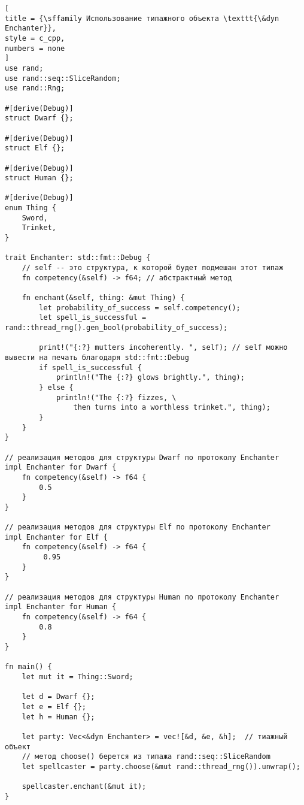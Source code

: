 \documentclass[%
	11pt,
	a4paper,
	utf8,
		]{article}
\begin{document}
\begin{lstlisting}[
title = {\sffamily Использование типажного объекта \texttt{\&dyn Enchanter}},
style = c_cpp,
numbers = none
]
use rand;
use rand::seq::SliceRandom;
use rand::Rng;

#[derive(Debug)]
struct Dwarf {};

#[derive(Debug)]
struct Elf {};

#[derive(Debug)]
struct Human {};

#[derive(Debug)]
enum Thing {
    Sword,
    Trinket,
}

trait Enchanter: std::fmt::Debug {
	// self -- это структура, к которой будет подмешан этот типаж
    fn competency(&self) -> f64; // абстрактный метод
    
    fn enchant(&self, thing: &mut Thing) {
        let probability_of_success = self.competency();
        let spell_is_successful = rand::thread_rng().gen_bool(probability_of_success);
        
        print!("{:?} mutters incoherently. ", self); // self можно вывести на печать благодаря std::fmt::Debug
        if spell_is_successful {
            println!("The {:?} glows brightly.", thing);
        } else {
            println!("The {:?} fizzes, \
                then turns into a worthless trinket.", thing);
        }
    }
}

// реализация методов для структуры Dwarf по протоколу Enchanter
impl Enchanter for Dwarf {
    fn competency(&self) -> f64 {
        0.5
    }
}

// реализация методов для структуры Elf по протоколу Enchanter
impl Enchanter for Elf {
    fn competency(&self) -> f64 {
         0.95
    }
}

// реализация методов для структуры Human по протоколу Enchanter
impl Enchanter for Human {
    fn competency(&self) -> f64 {
        0.8
    }
}

fn main() {
    let mut it = Thing::Sword;
    
    let d = Dwarf {};
    let e = Elf {};
    let h = Human {};
    
    let party: Vec<&dyn Enchanter> = vec![&d, &e, &h];  // тиажный объект
    // метод choose() берется из типажа rand::seq::SliceRandom
    let spellcaster = party.choose(&mut rand::thread_rng()).unwrap();
    
    spellcaster.enchant(&mut it);
}
\end{lstlisting}
\end{document}

